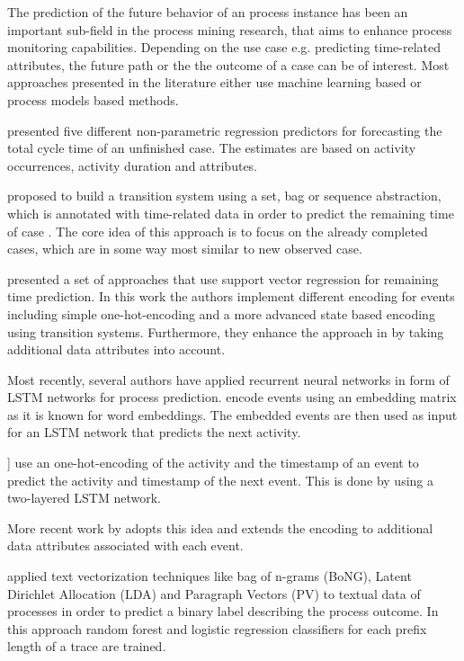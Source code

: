 
The prediction of the future behavior of an process instance has been an important sub-field in the process mining research, that aims to enhance process monitoring capabilities.
Depending on the use case e.g. predicting time-related attributes, the future path or the the outcome of a case can be of interest. 
Most approaches presented in the literature either use machine learning based or process models based methods.

 presented five different non-parametric regression predictors for forecasting the total cycle time of an unfinished case\cite{DBLP:conf/otm/DongenCA08}.
The estimates are based on activity occurrences, activity duration and attributes.

 proposed to build a transition system using a set, bag or sequence abstraction, which is annotated with time-related data in order to predict the remaining time of case \cite{DBLP:journals/is/AalstSS11}.
The core idea of this approach is to focus on the already completed cases, which are in some way most similar to new observed case.

\citeauthor{DBLP:journals/computing/PolatoSBL18} presented a set of approaches that use support vector regression for remaining time prediction\cite{DBLP:journals/computing/PolatoSBL18}.
In this work the authors implement different encoding for events including simple one-hot-encoding and a more advanced state based encoding using transition systems.
Furthermore, they enhance the approach in  \cite{DBLP:journals/is/AalstSS11} by taking additional data attributes into account.

Most recently, several authors have applied recurrent neural networks in form of LSTM networks for process prediction. \citeauthor{ DBLP:conf/bpm/EvermannRF16} encode events using an embedding matrix as it is known for word embeddings. The embedded events are then used as input for an LSTM network that predicts the next activity\cite{DBLP:conf/bpm/EvermannRF16}.

\citeauthor{DBLP:conf/caise/TaxVRD17}] use an one-hot-encoding of the activity and the timestamp of an event to predict the activity and timestamp of the next event. This is done by using a two-layered LSTM network\cite{DBLP:conf/caise/TaxVRD17}.

More recent work by \citeauthor{DBLP:conf/ssci/NavarinVPS17} adopts this idea and extends the encoding to additional data attributes associated with each event\cite{DBLP:conf/ssci/NavarinVPS17}.

\citeauthor{DBLP:conf/bpm/TeinemaaDMF16} applied text vectorization techniques like bag of n-grams (BoNG), Latent Dirichlet Allocation (LDA) and Paragraph Vectors (PV) to textual data of processes in order to predict a binary label describing the process outcome\cite{DBLP:conf/bpm/TeinemaaDMF16}. In this approach random forest and logistic regression classifiers for each prefix length of a trace are trained.